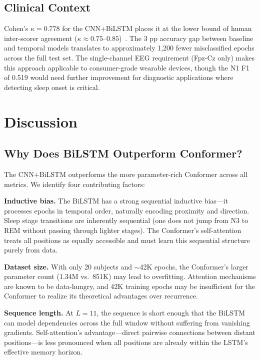 \documentclass[final]{article}
\begin{document}
\subsection{Clinical Context}

Cohen's $\kappa = 0.778$ for the CNN+BiLSTM places it at the lower bound of human inter-scorer agreement ($\kappa \approx 0.75$--$0.85$)~\cite{Rosenberg2013}. The 3 pp accuracy gap between baseline and temporal models translates to approximately 1,200 fewer misclassified epochs across the full test set. The single-channel EEG requirement (Fpz-Cz only) makes this approach applicable to consumer-grade wearable devices, though the N1 F1 of 0.519 would need further improvement for diagnostic applications where detecting sleep onset is critical.

\section{Discussion}

\subsection{Why Does BiLSTM Outperform Conformer?}

The CNN+BiLSTM outperforms the more parameter-rich Conformer across all metrics. We identify four contributing factors:

\textbf{Inductive bias.} The BiLSTM has a strong sequential inductive bias---it processes epochs in temporal order, naturally encoding proximity and direction. Sleep stage transitions are inherently sequential (one does not jump from N3 to REM without passing through lighter stages). The Conformer's self-attention treats all positions as equally accessible and must learn this sequential structure purely from data.

\textbf{Dataset size.} With only 20 subjects and $\sim$42K epochs, the Conformer's larger parameter count (1.34M vs.\ 851K) may lead to overfitting. Attention mechanisms are known to be data-hungry, and 42K training epochs may be insufficient for the Conformer to realize its theoretical advantages over recurrence.

\textbf{Sequence length.} At $L = 11$, the sequence is short enough that the BiLSTM can model dependencies across the full window without suffering from vanishing gradients. Self-attention's advantage---direct pairwise connections between distant positions---is less pronounced when all positions are already within the LSTM's effective memory horizon.
\end{document}
